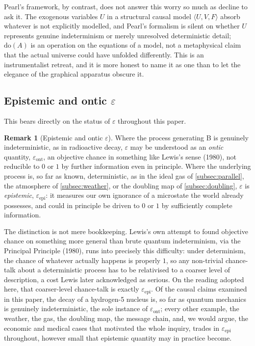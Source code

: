 \documentclass[11pt]{article}
\theoremstyle{definition}
\newtheorem{remark}{Remark}[section]
\newcommand{\eps}{\varepsilon}
\begin{document}
Pearl's framework, by contrast, does not answer this worry so much as decline to ask it. The exogenous variables $U$ in a structural causal model $\langle U, V, F\rangle$ absorb whatever is not explicitly modelled, and Pearl's formalism is silent on whether $U$ represents genuine indeterminism or merely unresolved deterministic detail; $\mathrm{do}(A)$ is an operation on the equations of a model, not a metaphysical claim that the actual universe could have unfolded differently. This is an instrumentalist retreat, and it is more honest to name it as one than to let the elegance of the graphical apparatus obscure it.

\subsection{Epistemic and ontic \texorpdfstring{$\eps$}{epsilon}}

This bears directly on the status of $\eps$ throughout this paper.

\begin{remark}[Epistemic and ontic $\eps$]
\label{rem:epsdist}
Where the process generating B is genuinely indeterministic, as in radioactive decay, $\eps$ may be understood as an \emph{ontic} quantity, $\eps_{\mathrm{ont}}$, an objective chance in something like Lewis's sense (1980), not reducible to $0$ or $1$ by further information even in principle. Where the underlying process is, so far as known, deterministic, as in the ideal gas of \cref{subsec:parallel}, the atmosphere of \cref{subsec:weather}, or the doubling map of \cref{subsec:doubling}, $\eps$ is \emph{epistemic}, $\eps_{\mathrm{epi}}$: it measures our own ignorance of a microstate the world already possesses, and could in principle be driven to $0$ or $1$ by sufficiently complete information.
\end{remark}

The distinction is not mere bookkeeping. Lewis's own attempt to found objective chance on something more general than brute quantum indeterminism, via the Principal Principle (1980), runs into precisely this difficulty: under determinism, the chance of whatever actually happens is properly $1$, so any non-trivial chance-talk about a deterministic process has to be relativised to a coarser level of description, a cost Lewis later acknowledged as serious. On the reading adopted here, that coarser-level chance-talk is exactly $\eps_{\mathrm{epi}}$. Of the causal claims examined in this paper, the decay of a hydrogen-5 nucleus is, so far as quantum mechanics is genuinely indeterministic, the sole instance of $\eps_{\mathrm{ont}}$; every other example, the weather, the gas, the doubling map, the message chain, and, we would argue, the economic and medical cases that motivated the whole inquiry, trades in $\eps_{\mathrm{epi}}$ throughout, however small that epistemic quantity may in practice become.
\end{document}
